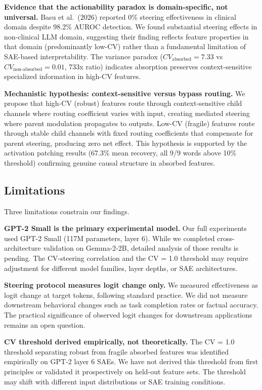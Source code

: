 \documentclass{article}
\begin{document}
\textbf{Evidence that the actionability paradox is domain-specific, not universal.} Basu et al.\ (2026) reported 0\% steering effectiveness in clinical domain despite 98.2\% AUROC detection. We found substantial steering effects in non-clinical LLM domain, suggesting their finding reflects feature properties in that domain (predominantly low-CV) rather than a fundamental limitation of SAE-based interpretability. The variance paradox ($CV_{\text{absorbed}} = 7.33$ vs $CV_{\text{non-absorbed}} = 0.01$, 733x ratio) indicates absorption preserves context-sensitive specialized information in high-CV features.

\textbf{Mechanistic hypothesis: context-sensitive versus bypass routing.} We propose that high-CV (robust) features route through context-sensitive child channels where routing coefficient varies with input, creating mediated steering where parent modulation propagates to outputs. Low-CV (fragile) features route through stable child channels with fixed routing coefficients that compensate for parent steering, producing zero net effect. This hypothesis is supported by the activation patching results (67.3\% mean recovery, all 9/9 words above 10\% threshold) confirming genuine causal structure in absorbed features.

\subsection{Limitations}

Three limitations constrain our findings.

\textbf{GPT-2 Small is the primary experimental model.} Our full experiments used GPT-2 Small (117M parameters, layer 6). While we completed cross-architecture validation on Gemma-2-2B, detailed analysis of those results is pending. The CV-steering correlation and the CV = 1.0 threshold may require adjustment for different model families, layer depths, or SAE architectures.

\textbf{Steering protocol measures logit change only.} We measured effectiveness as logit change at target tokens, following standard practice. We did not measure downstream behavioral changes such as task completion rates or factual accuracy. The practical significance of observed logit changes for downstream applications remains an open question.

\textbf{CV threshold derived empirically, not theoretically.} The CV = 1.0 threshold separating robust from fragile absorbed features was identified empirically on GPT-2 layer 6 SAEs. We have not derived this threshold from first principles or validated it prospectively on held-out feature sets. The threshold may shift with different input distributions or SAE training conditions.
\end{document}
